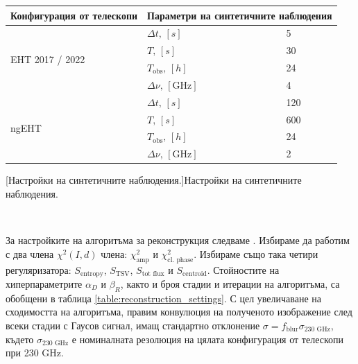 \begin{minipage}{18em}
	\begin{center}
		\begin{tabular}{|| m{7.5em} | m{5em} | m{2em} ||}
			\hline 
			Конфигурация от телескопи & \multicolumn{2}{m{7em}||}{Параметри на синтетичните наблюдения} \\
			\hline
			\multirow{4}{7.5em}{\centering \small EHT 2017 / 2022} &\centering $\Delta t,\, [s]$    		& 5   \\ 
														&\centering $T,\,[s]$ 		     		& 30  \\ 
														&\centering $T_\text{obs},\,[h]$ 		& 24  \\
														&\centering $\Delta \nu,\,[\text{GHz}]$ & 4 \\
			\hline
			\multirow{4}{7.5em}{\centering \small ngEHT} 		  & \centering $\Delta t,\, [s]$    	   & 120 \\ 
													  & \centering $T,\,[s]$ 		      	   & 600 \\ 
												      & \centering $T_\text{obs},\,[h]$ 	   & 24  \\
												      & \centering $\Delta \nu,\,[\text{GHz}]$ & 2 \\
			\hline
		\end{tabular}
	\end{center}
	[Настройки на синтетичните наблюдения.]{Настройки на синтетичните наблюдения.}
	\label{table:ehtim_obs_settings}
\end{minipage}\,\,
\begin{minipage}{18em}
	За настройките на алгоритъма за реконструкция следваме \cite{EHTIM}. Избираме да работим с два члена $\chi^2(I,d)$ члена: $\chi^2_\text{amp}$ и $\chi^2_\text{cl. phase}$. Избираме също така четири регуляризатора: $S_\text{entropy}$, $S_\text{TSV}$, $S_\text{tot flux}$ и $S_\text{centroid}$. Стойностите на хиперпараметрите $\alpha_D$ и $\beta_R$, както и броя стадии и итерации на алгоритъма, са обобщени в таблица \ref{table:reconstruction_settings}. С цел увеличаване на сходимостта на алгоритъма, правим конвулюция на полученото изображение след всеки стадии с Гаусов сигнал, имащ стандартно отклонение $\sigma = f_\text{blur} \sigma_{\text{230 GHz}}$, където $\sigma_{\text{230 GHz}}$ е номиналната резолюция на цялата конфигурация от телескопи при 230 GHz.
\end{minipage}

